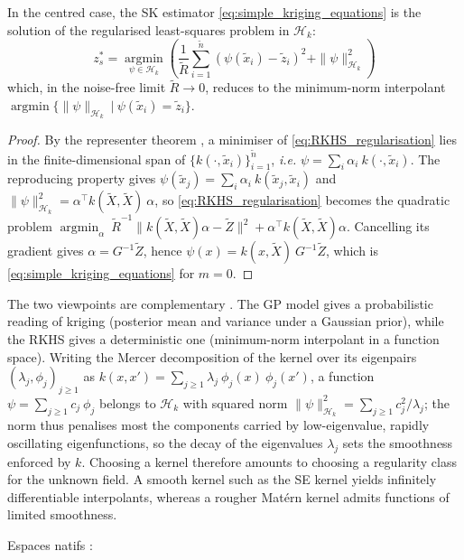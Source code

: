 \begin{proposition}
	In the centred case, the SK estimator \eqref{eq:simple_kriging_equations} is the solution of the regularised least-squares problem in $\mathcal{H}_k$:
	\begin{equation}
		z_s^*=\underset{\psi\in\mathcal{H}_k}{\operatorname{argmin}}\left(\frac{1}{\tilde{R}}\sum_{i=1}^{\tilde{n}}\left(\psi(\tilde{x}_i)-\tilde{z}_i\right)^2+\|\psi\|_{\mathcal{H}_k}^2\right)\label{eq:RKHS_regularisation}
	\end{equation}
	which, in the noise-free limit $\tilde{R}\to0$, reduces to the minimum-norm interpolant $\operatorname{argmin}\{\|\psi\|_{\mathcal{H}_k}\:|\:\psi(\tilde{x}_i)=\tilde{z}_i\}$.
\end{proposition}

\begin{proof}
	By the representer theorem \cite{bib:representer,bib:representer-generalised}, a minimiser of \eqref{eq:RKHS_regularisation} lies in the finite-dimensional span of $\{k(\cdot,\tilde{x}_i)\}_{i=1}^{\tilde{n}}$, \textit{i.e.} $\psi=\sum_i\alpha_i\:k(\cdot,\tilde{x}_i)$. The reproducing property gives $\psi(\tilde{x}_j)=\sum_i\alpha_i\:k(\tilde{x}_j,\tilde{x}_i)$ and $\|\psi\|_{\mathcal{H}_k}^2=\alpha^\top k(\tilde{X},\tilde{X})\:\alpha$, so \eqref{eq:RKHS_regularisation} becomes the quadratic problem $\operatorname{argmin}_\alpha\:\tilde{R}^{-1}\|k(\tilde{X},\tilde{X})\alpha-\tilde{Z}\|^2+\alpha^\top k(\tilde{X},\tilde{X})\alpha$. Cancelling its gradient gives $\alpha=G^{-1}\tilde{Z}$, hence $\psi(x)=k(x,\tilde{X})\:G^{-1}\tilde{Z}$, which is \eqref{eq:simple_kriging_equations} for $m=0$.
\end{proof}

\begin{remark}
	The two viewpoints are complementary \cite{bib:Rasmussen-relationships}. The GP model gives a probabilistic reading of kriging (posterior mean and variance under a Gaussian prior), while the RKHS gives a deterministic one (minimum-norm interpolant in a function space). Writing the Mercer decomposition of the kernel over its eigenpairs $(\lambda_j,\phi_j)_{j\geq1}$ as $k(x,x')=\sum_{j\geq1}\lambda_j\:\phi_j(x)\:\phi_j(x')$, a function $\psi=\sum_{j\geq1}c_j\:\phi_j$ belongs to $\mathcal{H}_k$ with squared norm $\|\psi\|_{\mathcal{H}_k}^2=\sum_{j\geq1}c_j^2/\lambda_j$; the norm thus penalises most the components carried by low-eigenvalue, rapidly oscillating eigenfunctions, so the decay of the eigenvalues $\lambda_j$ sets the smoothness enforced by $k$. Choosing a kernel therefore amounts to choosing a regularity class for the unknown field. A smooth kernel such as the SE kernel yields infinitely differentiable interpolants, whereas a rougher Matérn kernel admits functions of limited smoothness.
\end{remark}

Espaces natifs : \cite{bib:Wendland} 
